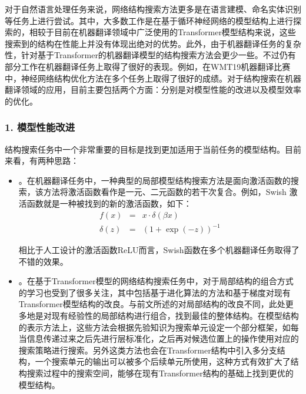 \parinterval 对于自然语言处理任务来说，网络结构搜索方法更多是在语言建模、命名实体识别等任务上进行尝试。其中，大多数工作是在基于循环神经网络的模型结构上进行探索的，相较于目前在机器翻译领域中广泛使用的Transformer模型结构来说，这些搜索到的结构在性能上并没有体现出绝对的优势。此外，由于机器翻译任务的复杂性，针对基于Transformer的机器翻译模型的结构搜索方法会更少一些。不过仍有部分工作在机器翻译任务上取得了很好的表现。例如，在WMT19机器翻译比赛中，神经网络结构优化方法在多个任务上取得了很好的成绩。对于结构搜索在机器翻译领域的应用，目前主要包括两个方面：分别是对模型性能的改进以及模型效率的优化。


\subsubsection{1. 模型性能改进}

\parinterval 结构搜索任务中一个非常重要的目标是找到更加适用于当前任务的模型结构。目前来看，有两种思路：

\begin{itemize}
\vspace{0.5em}
\item {\small{}}。在机器翻译任务中，一种典型的局部模型结构搜索方法是面向激活函数的搜索，该方法将激活函数看作是一元、二元函数的若干次复合。例如，Swish 激活函数就是一种被找到的新的激活函数，如下：
\begin{eqnarray}
f(x) &=& x \cdot \delta(\beta x) \\
\delta(z) &=& {(1 + \exp{(-z)})}^{-1}
\label{eq:15-60}
\end{eqnarray}

\noindent 相比于人工设计的激活函数ReLU而言，Swish函数在多个机器翻译任务取得了不错的效果。
\vspace{0.5em}
\item {\small{}}。在基于Transformer模型的网络结构搜索任务中，对于局部结构的组合方式的学习也受到了很多关注，其中包括基于进化算法的方法和基于梯度对现有Transformer模型结构的改良。与前文所述的对局部结构的改良不同，此处更多地是对现有经验性的局部结构进行组合，找到最佳的整体结构。在模型结构的表示方法上，这些方法会根据先验知识为搜索单元设定一个部分框架，如每当信息传递过来之后先进行层标准化，之后再对候选位置上的操作使用对应的搜索策略进行搜索。另外这类方法也会在Transformer结构中引入多分支结构，一个搜索单元的输出可以被多个后续单元所使用，这种方式有效扩大了结构搜索过程中的搜索空间，能够在现有Transformer结构的基础上找到更优的模型结构。
\vspace{0.5em}
\end{itemize}


